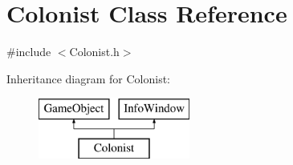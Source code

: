 \hypertarget{class_colonist}{}\section{Colonist Class Reference}
\label{class_colonist}


{\ttfamily \#include $<$Colonist.\+h$>$}

Inheritance diagram for Colonist\+:\begin{figure}[H]
\begin{center}
\leavevmode
\includegraphics[height=2.000000cm]{class_colonist}
\end{center}
\end{figure}
